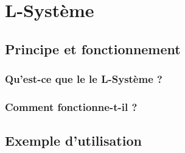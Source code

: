 \chapter{L-Système}

\section{Principe et fonctionnement}

\subsection{Qu'est-ce que le le L-Système ?}

\subsection{Comment fonctionne-t-il ?}

\section{Exemple d'utilisation}


